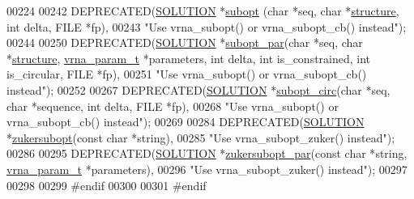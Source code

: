 \begin{DoxyCode}
00224 
00242 DEPRECATED(\hyperlink{structvrna__subopt__sol__s}{SOLUTION} *\hyperlink{group__subopt__wuchty_ga700f662506a233e42dd7fda74fafd40e}{subopt} (\textcolor{keywordtype}{char} *seq, \textcolor{keywordtype}{char} *\hyperlink{structvrna__subopt__sol__s_a3c632c7f08eb6a8827c6151625e5ef8e}{structure}, \textcolor{keywordtype}{int} delta, FILE *fp),
00243 \textcolor{stringliteral}{"Use vrna\_subopt() or vrna\_subopt\_cb() instead"});
00244 
00250 DEPRECATED(\hyperlink{structvrna__subopt__sol__s}{SOLUTION} *\hyperlink{group__subopt__wuchty_gaa1e1e7031a948ebcb39a9d58d1e9842c}{subopt\_par}(\textcolor{keywordtype}{char} *seq, \textcolor{keywordtype}{char} *\hyperlink{structvrna__subopt__sol__s_a3c632c7f08eb6a8827c6151625e5ef8e}{structure}, 
      \hyperlink{group__energy__parameters_structvrna__param__s}{vrna\_param\_t} *parameters, \textcolor{keywordtype}{int} delta, \textcolor{keywordtype}{int} is\_constrained, \textcolor{keywordtype}{int} is\_circular, FILE *fp),
00251 \textcolor{stringliteral}{"Use vrna\_subopt() or vrna\_subopt\_cb() instead"});
00252 
00267 DEPRECATED(\hyperlink{structvrna__subopt__sol__s}{SOLUTION} *\hyperlink{group__subopt__wuchty_ga8634516e4740e0b6c9a46d2bae940340}{subopt\_circ}(\textcolor{keywordtype}{char} *seq, \textcolor{keywordtype}{char} *sequence, \textcolor{keywordtype}{int} delta, FILE *fp),
00268 \textcolor{stringliteral}{"Use vrna\_subopt() or vrna\_subopt\_cb() instead"});
00269 
00284 DEPRECATED(\hyperlink{structvrna__subopt__sol__s}{SOLUTION}  *\hyperlink{group__subopt__zuker_ga0d5104e3ecf119d8eabd40aa5fe47f90}{zukersubopt}(\textcolor{keyword}{const} \textcolor{keywordtype}{char} *\textcolor{keywordtype}{string}),
00285 \textcolor{stringliteral}{"Use vrna\_subopt\_zuker() instead"});
00286 
00295 DEPRECATED(\hyperlink{structvrna__subopt__sol__s}{SOLUTION}  *\hyperlink{group__subopt__zuker_gab6d0ea8cc1d02f6dd831ca81043c9eb8}{zukersubopt\_par}(\textcolor{keyword}{const} \textcolor{keywordtype}{char} *\textcolor{keywordtype}{string}, 
      \hyperlink{group__energy__parameters_structvrna__param__s}{vrna\_param\_t} *parameters),
00296 \textcolor{stringliteral}{"Use vrna\_subopt\_zuker() instead"});
00297 
00298 
00299 \textcolor{preprocessor}{#endif}
00300 
00301 \textcolor{preprocessor}{#endif}
\end{DoxyCode}

